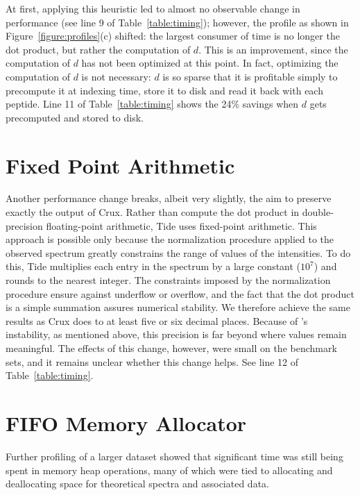 At first, applying this heuristic led to almost no observable change in performance (see line 9
of Table~\ref{table:timing}); however, the profile as shown in
Figure~\ref{figure:profiles}(c) shifted: the largest consumer of time
is no longer the dot product, but rather the computation of $d$. This
is an improvement, since the computation of $d$ has not been optimized
at this point. In fact, optimizing the computation of $d$ is not
necessary: $d$ is so sparse that it is profitable simply to
precompute it at indexing time, store it to disk and read it back
with each peptide. Line 11 of Table~\ref{table:timing} shows the 24\%
savings when $d$ gets precomputed and stored to disk.

\section{Fixed Point Arithmetic \label{section:fixedpoint}}

Another performance change breaks, albeit very slightly, the aim to
preserve exactly the output of Crux. Rather than compute the dot
product in double-precision floating-point arithmetic, Tide uses
fixed-point arithmetic. This approach is possible only because the
normalization procedure applied to the observed spectrum greatly
constrains the range of values of the intensities. To do this, Tide
multiplies each entry in the spectrum by a large constant ($10^7$) and
rounds to the nearest integer. The constraints imposed by the
normalization procedure ensure against underflow or overflow, and the
fact that the dot product is a simple summation assures numerical
stability. We therefore achieve the same results as Crux does to at
least five or six decimal places. Because of \XCorr's instability, as
mentioned above, this precision is far beyond where \XCorr values
remain meaningful. The effects of this change, however, were small on
the benchmark sets, and it remains unclear whether this change
helps. See line 12 of Table~\ref{table:timing}.

\section{FIFO Memory Allocator \label{section:fifo}}

Further profiling of a larger dataset showed that significant time
was still being spent in memory heap operations, many of which were
tied to allocating and deallocating space for theoretical spectra and
associated data.

